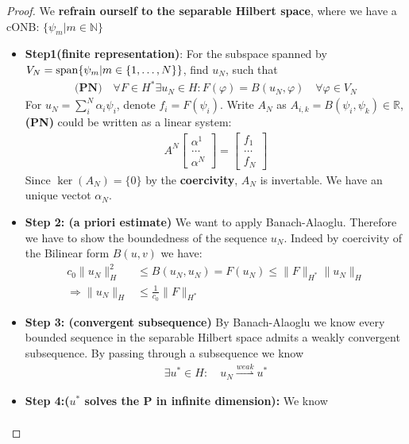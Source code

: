 \begin{proof} We \textbf{refrain ourself to the separable Hilbert space}, where we have a cONB: $\{ \psi
_m | m \in \mathbb{N} \}$
\begin{itemize}
\item \textbf{Step1(finite representation)}: 
For the subspace spanned by $V_N = \operatorname*{span} \{ \psi_m | m \in \{1, \dots, N\} \}$, find $u_N$, such that 
\begin{align*}
	\textbf{(PN)} \quad \forall F \in H^* \exists u_N \in H: F(\varphi) = B(u_N, \varphi) \quad \forall \varphi \in V_N
\end{align*}
For $u_N = \sum^N_i \alpha_i \psi_i$, denote $f_i = F(\psi_i) $. Write $A_N$ as $A_{i, k} = B(\psi_i, \psi_k ) \in \mathbb{R} $, \textbf{(PN)} could be written as a linear system:
\begin{align*}
	A^N 
	\begin{bmatrix}
		\alpha^1 \\
		\dots\\
		\alpha^N
	\end{bmatrix}
	= 
	\begin{bmatrix}
		f_1 \\
		\dots\\
		f_N
	\end{bmatrix}
\end{align*}
Since $\ker(A_N) = \{0\}$ by the \textbf{coercivity}, $A_N$ is invertable. We have an unique vectot $\alpha_N$.
\item \textbf{Step 2: (a priori estimate)}
We want to apply Banach-Alaoglu. Therefore we have to show the boundedness of the sequence $u_N$. Indeed by coercivity of the Bilinear form $B(u, v)$ we have:
\begin{align*}
	c_0 \|u_N\|_H^2 &\leq B(u_N, u_N) = F(u_N) \leq \|F\|_{H^*}\|u_N\|_H\\
	\Rightarrow 
	 \|u_N\|_H &\leq \frac{1}{c_0}  \|F\|_{H^*}
\end{align*}
\item \textbf{Step 3: (convergent subsequence)}
By Banach-Alaoglu we know every bounded sequence in the separable Hilbert space admits a weakly convergent subsequence. By passing through a subsequence we know
\begin{align*}
	\exists u^* \in H: \quad u_N \overset{weak}{\rightharpoonup} u^*
\end{align*}
\item \textbf{Step 4:($u^*$ solves the P in infinite dimension):} We know
\begin{align*}

\end{align*}
\end{itemize}
\end{proof}
